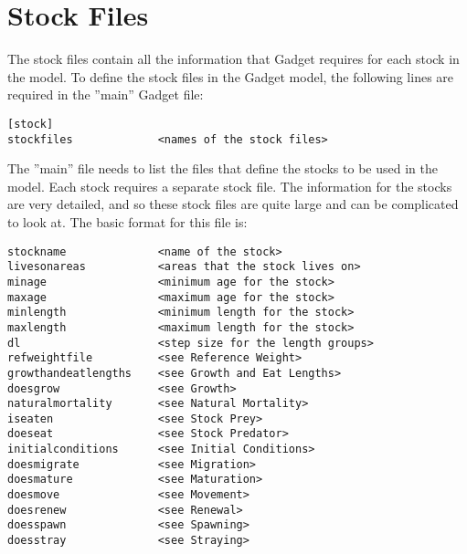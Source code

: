 \documentclass [a4paper, 10pt]{book}
\begin{document}
\chapter{Stock Files}\label{chap:stock}
The stock files contain all the information that Gadget requires for each stock in the model.  To define the stock files in the Gadget model, the following lines are required in the ''main'' Gadget file:

{\small\begin{verbatim}
[stock]
stockfiles             <names of the stock files>
\end{verbatim}}



The ''main'' file needs to list the files that define the stocks to be used in the model.  Each stock requires a separate stock file.  The information for the stocks are very detailed, and so these stock files are quite large and can be complicated to look at.  The basic format for this file is:

{\small\begin{verbatim}
stockname              <name of the stock>
livesonareas           <areas that the stock lives on>
minage                 <minimum age for the stock>
maxage                 <maximum age for the stock>
minlength              <minimum length for the stock>
maxlength              <maximum length for the stock>
dl                     <step size for the length groups>
refweightfile          <see Reference Weight>
growthandeatlengths    <see Growth and Eat Lengths>
doesgrow               <see Growth>
naturalmortality       <see Natural Mortality>
iseaten                <see Stock Prey>
doeseat                <see Stock Predator>
initialconditions      <see Initial Conditions>
doesmigrate            <see Migration>
doesmature             <see Maturation>
doesmove               <see Movement>
doesrenew              <see Renewal>
doesspawn              <see Spawning>
doesstray              <see Straying>
\end{verbatim}}
\end{document}
